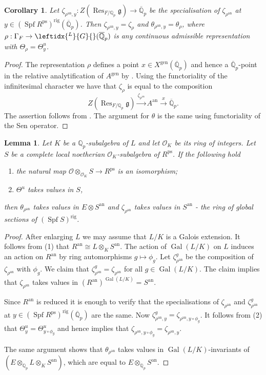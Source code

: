\documentclass{amsart}
\newtheorem{lem}[prop]{Lemma}
\newtheorem{cor}[prop]{Corollary}
\theoremstyle{definition}
\theoremstyle{remark}
\DeclareMathOperator{\Res}{Res}
\DeclareMathOperator{\Gal}{Gal}
\newcommand{\Qp}{\mathbb {Q}_p}
\newcommand{\Qpbar}{\overline{\mathbb{Q}}_p}
\newcommand{\OO}{\mathcal O}
\newcommand{\ana}{\mathrm{an}}
\newcommand{\gen}{\mathrm{gen}}
\DeclareMathOperator{\Spf}{Spf}
\newcommand{\rig}{\mathrm{rig}}
\newcommand{\ps}{\mathrm{ps}}
\newcommand{\LG}{\leftidx{^L}{G}{}}
\begin{document}
 \begin{cor}\label{special_again} Let $\zeta_{\rho^{\ana},y}: Z(\Res_{F/\Qp} \mathfrak g)\rightarrow \Qpbar$  be the specialisation of $\zeta_{\rho^{\ana}}$ at $y\in (\Spf R^{\ps})^{\rig}(\Qpbar)$. Then $\zeta_{\rho^{\ana},y} =\zeta_{\rho}$ and $\theta_{\rho^{\ana},y}=\theta_{\rho}$, where 
 $\rho: \Gamma_F \rightarrow \LG(\Qpbar)$ is any continuous 
 admissible representation with $\Theta_{\rho}=\Theta^u_y$. 
 \end{cor}
 \begin{proof} The representation $\rho$ defines 
 a point $x\in X^{\gen}(\Qpbar)$ and hence a $\Qpbar$-point in the relative analytification of $A^{\gen}$ by . Using the functoriality of the infinitesimal  character we have that $\zeta_{\rho}$ 
 is equal to the composition 
 $$Z(\Res_{F/\Qp}\mathfrak g)\overset{\zeta_{\rho^{\ana}}}{\longrightarrow} A^{\ana} \overset{x}{\longrightarrow} \Qpbar.$$
  The assertion follows from . The argument 
  for $\theta$ is the same using functoriality of the Sen operator. 
 \end{proof}
 
 


 \begin{lem}\label{descent} Let $K$ be a $\Qp$-subalgebra of $L$ and let  $\OO_K$ be its ring of integers. 
 Let $S$ be a complete local 
 noetherian $\OO_K$-subalgebra of $R^{\ps}$.
  If the following hold 
 \begin{enumerate}
 \item the natural map $\OO\otimes_{\OO_K} S \rightarrow R^{\ps}$ is an isomorphism;
 \item $\Theta^u$ takes values in $S$,
 \end{enumerate}
 then $\theta_{\rho^{\ana}}$ takes values in $E\otimes S^{\ana}$ and $\zeta_{\rho^{\ana}}$ takes values 
 in $S^{\ana}$ - the ring of global 
 sections of $(\Spf S)^{\rig}$. 
 \end{lem}
 \begin{proof}  After enlarging $L$ we may assume that $L/K$ is a Galois extension. It follows 
 from (1) that $R^{\ana}\cong L\otimes_K S^{\ana}$. The action of $\Gal(L/K)$ on $L$ 
 induces an action on $R^{\ana}$ by ring automorphisms $g\mapsto \phi_g$. Let 
 $\zeta_{\rho^\ana}^g$ be the composition of 
 $\zeta_{\rho^{\ana}}$ with $\phi_g$. 
 We claim that $\zeta_{\rho^{\ana}}^g= \zeta_{\rho^{\ana}}$ for all $g\in \Gal(L/K)$. 
 The claim implies that $\zeta_{\rho^{\ana}}$ 
 takes values in $(R^{\ana})^{\Gal(L/K)}=S^{\ana}$. 
 
 Since $R^{\ana}$ is reduced it is enough to verify 
 that the specialisations of $\zeta_{\rho^{\ana}}$
 and $\zeta^g_{\rho^{\ana}}$ at $y\in (\Spf R^{\ps})^{\rig}(\Qpbar)$ 
 are the same. Now 
 $\zeta^g_{\rho^{\ana},y}= \zeta_{\rho^{\ana}, y\circ \phi_g}$.
 It follows from (2) that $\Theta^u_y= \Theta^u_{y\circ \phi_g}$ and hence  implies that 
 $\zeta_{\rho^{\ana}, y\circ \phi_g}=\zeta_{\rho^{\ana}, y}$. 
 
 The same argument 
 shows that $\theta_{\rho^{\ana}}$ takes values in 
 $\Gal(L/K)$-invariants of 
 $(E\otimes_{\Qp} L\otimes_K S^{\ana})$, which are equal to  $E\otimes_{\Qp} S^{\ana}$.
 \end{proof} 
 
\end{document}
